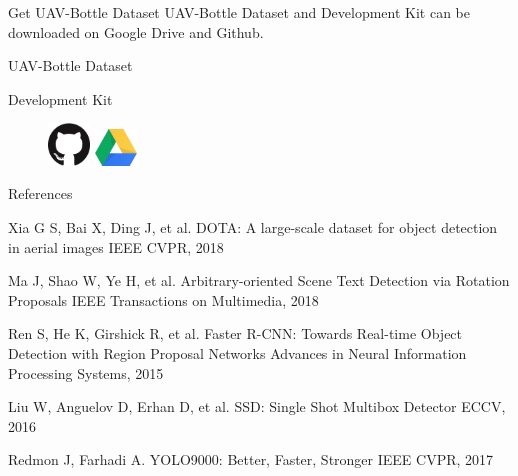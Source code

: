 \documentclass[newPxFont, fullfooter, sectionpages, progressbar, displaynote]{beamer}
\begin{document}
\begin{frame}[c]{Get UAV-Bottle Dataset}
	\vspace{10mm}
	UAV-Bottle Dataset and Development Kit can be downloaded on Google Drive and Github. \\
\vspace{1em}
\begin{center}
	\large{UAV-Bottle Dataset}

	\large{Development Kit}
	\vspace{1.5em}

	\begin{figure}
		\centerline{
			\includegraphics[width=0.1\textwidth]{images/GitHub-Mark-120px-plus.png}
			\hspace{1.5cm}
			\includegraphics[width=0.1\textwidth]{images/Google_Drive_Logo.png}
			}
	\end{figure}
	
\end{center}
\end{frame}



\begin{frame}{References}
	\begin{thebibliography}{10}
	\scriptsize
	\beamertemplatearticlebibitems
	Xia G S, Bai X, Ding J, et al.
	\newblock DOTA: A large-scale dataset for object detection in aerial images
	\newblock IEEE CVPR, 2018

	\beamertemplatearticlebibitems
	Ma J, Shao W, Ye H, et al.
	\newblock Arbitrary-oriented Scene Text Detection via Rotation Proposals
	\newblock IEEE Transactions on Multimedia, 2018
	
	\beamertemplatearticlebibitems
	Ren S, He K, Girshick R, et al.
	\newblock Faster R-CNN: Towards Real-time Object Detection with Region Proposal Networks
	\newblock Advances in Neural Information Processing Systems, 2015
	
	\beamertemplatearticlebibitems
	Liu W, Anguelov D, Erhan D, et al.
	\newblock SSD: Single Shot Multibox Detector
	\newblock ECCV, 2016
	
	\beamertemplatearticlebibitems
	Redmon J, Farhadi A.
	\newblock YOLO9000: Better, Faster, Stronger
	\newblock IEEE CVPR, 2017

  \end{thebibliography}
\end{frame}
\end{document}
